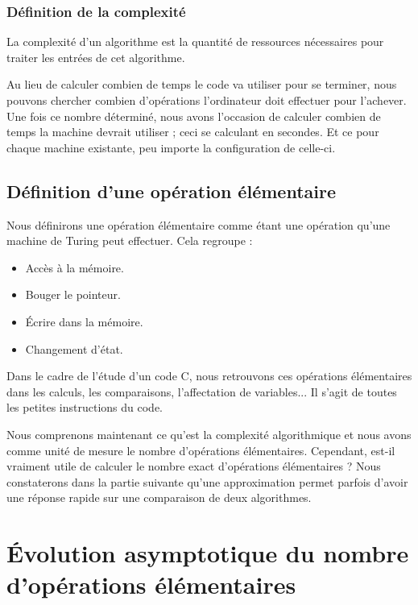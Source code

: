 \documentclass[12pt, twoside, openright]{report}
\begin{document}
\subsubsection{Définition de la complexité }


La complexité d'un algorithme est la quantité de ressources nécessaires pour traiter les entrées de cet algorithme.\cite{complexite01}

Au lieu de calculer combien de temps le code va utiliser pour se terminer, nous pouvons chercher combien d'opérations l'ordinateur doit effectuer pour l'achever. Une fois ce nombre déterminé, nous avons l'occasion de calculer combien de temps la machine devrait utiliser ; ceci se calculant en secondes. Et ce pour chaque machine existante, peu importe la configuration de celle-ci.

\subsection{Définition d'une opération élémentaire}

Nous définirons une opération élémentaire comme étant une opération qu'une machine de Turing peut effectuer. Cela regroupe :

\begin{itemize}
    \item Accès à la mémoire. 
    \item Bouger le pointeur.
    \item Écrire dans la mémoire.
    \item Changement d'état.
\end{itemize}

Dans le cadre de l'étude d'un code C, nous retrouvons ces opérations élémentaires dans les calculs, les comparaisons, l'affectation de variables... Il s'agit de toutes les petites instructions du code.

Nous comprenons maintenant ce qu'est la complexité algorithmique et nous avons comme unité de mesure le nombre d'opérations élémentaires. Cependant, est-il vraiment utile de calculer le nombre exact d'opérations élémentaires ? Nous constaterons dans la partie suivante qu'une approximation permet parfois d'avoir une réponse rapide sur une comparaison de deux algorithmes. 

\section{Évolution asymptotique du nombre d'opérations élémentaires}
\end{document}
